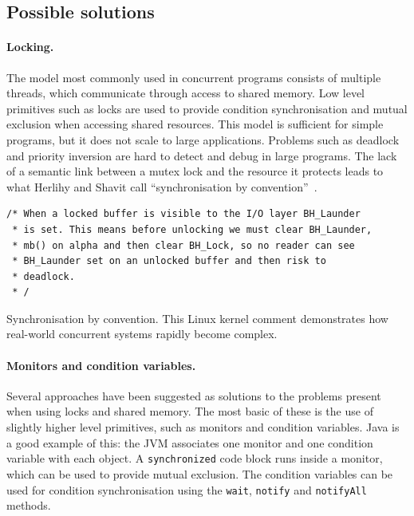 \documentclass[12pt,a4paper,oneside,openright]{report}
\newcommand{\mycaption}[2]{\caption[#1]{#1 #2}}
\newcommand{\javaKeyword}[1]{\texttt{#1}}
\newcommand{\javaMethod}[1]{\texttt{#1}}
\begin{document}
\subsection{Possible solutions}
\label{sec:possible-solutions}

\paragraph{Locking.} The model most commonly used in concurrent
programs consists of multiple threads, which communicate through
access to shared memory. Low level primitives such as locks are used
to provide condition synchronisation and mutual exclusion when
accessing shared resources. This model is sufficient for simple
programs, but it does not scale to large applications. Problems such
as deadlock and priority inversion are hard to detect and debug in
large programs. The lack of a semantic link between a mutex lock and
the resource it protects leads to what Herlihy and Shavit call
``synchronisation by convention''~\cite[Chapter
18]{ArtMultiprocessorProgramming}.

\begin{Listing}[hbtp]
\begin{lstlisting}
/* When a locked buffer is visible to the I/O layer BH_Launder
 * is set. This means before unlocking we must clear BH_Launder,
 * mb() on alpha and then clear BH_Lock, so no reader can see
 * BH_Launder set on an unlocked buffer and then risk to
 * deadlock.
 * /
\end{lstlisting}

  \mycaption{Synchronisation by convention.}{This Linux kernel comment
    demonstrates how real-world concurrent systems rapidly become
    complex.}
  \label{lst:syncConv}
\end{Listing}


\paragraph{Monitors and condition variables.} Several approaches have
been suggested as solutions to the problems present when using locks
and shared memory. The most basic of these is the use of slightly
higher level primitives, such as monitors and condition
variables. Java is a good example of this: the JVM associates one
monitor and one condition variable with each object. A
\javaKeyword{synchronized} code block runs inside a monitor, which can
be used to provide mutual exclusion. The condition variables can be
used for condition synchronisation using the \javaMethod{wait},
\javaMethod{notify} and \javaMethod{notifyAll} methods.
\end{document}
